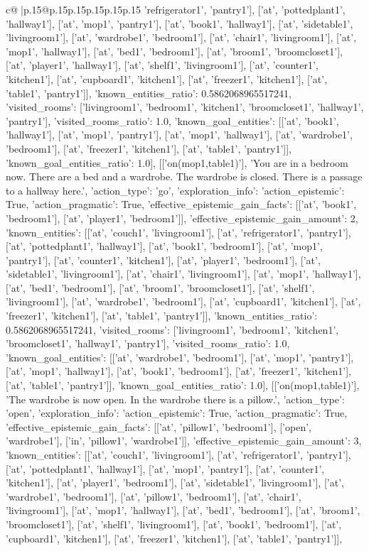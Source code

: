 \documentclass{article}
\begin{document}
{\begin{supertabular}{c@{$\;$}|p{.15\linewidth}@{}p{.15\linewidth}p{.15\linewidth}p{.15\linewidth}p{.15\linewidth}p{.15\linewidth}}
{{{'refrigerator1', 'pantry1'], ['at', 'pottedplant1', 'hallway1'], ['at', 'mop1', 'pantry1'], ['at', 'book1', 'hallway1'], ['at', 'sidetable1', 'livingroom1'], ['at', 'wardrobe1', 'bedroom1'], ['at', 'chair1', 'livingroom1'], ['at', 'mop1', 'hallway1'], ['at', 'bed1', 'bedroom1'], ['at', 'broom1', 'broomcloset1'], ['at', 'player1', 'hallway1'], ['at', 'shelf1', 'livingroom1'], ['at', 'counter1', 'kitchen1'], ['at', 'cupboard1', 'kitchen1'], ['at', 'freezer1', 'kitchen1'], ['at', 'table1', 'pantry1']], 'known_entities_ratio': 0.5862068965517241, 'visited_rooms': ['livingroom1', 'bedroom1', 'kitchen1', 'broomcloset1', 'hallway1', 'pantry1'], 'visited_rooms_ratio': 1.0, 'known_goal_entities': [['at', 'book1', 'hallway1'], ['at', 'mop1', 'pantry1'], ['at', 'mop1', 'hallway1'], ['at', 'wardrobe1', 'bedroom1'], ['at', 'freezer1', 'kitchen1'], ['at', 'table1', 'pantry1']], 'known_goal_entities_ratio': 1.0}}], [['on(mop1,table1)'], 'You are in a bedroom now. There are a bed and a wardrobe. The wardrobe is closed. There is a passage to a hallway here.', {'action_type': 'go', 'exploration_info': {'action_epistemic': True, 'action_pragmatic': True, 'effective_epistemic_gain_facts': [['at', 'book1', 'bedroom1'], ['at', 'player1', 'bedroom1']], 'effective_epistemic_gain_amount': 2, 'known_entities': [['at', 'couch1', 'livingroom1'], ['at', 'refrigerator1', 'pantry1'], ['at', 'pottedplant1', 'hallway1'], ['at', 'book1', 'bedroom1'], ['at', 'mop1', 'pantry1'], ['at', 'counter1', 'kitchen1'], ['at', 'player1', 'bedroom1'], ['at', 'sidetable1', 'livingroom1'], ['at', 'chair1', 'livingroom1'], ['at', 'mop1', 'hallway1'], ['at', 'bed1', 'bedroom1'], ['at', 'broom1', 'broomcloset1'], ['at', 'shelf1', 'livingroom1'], ['at', 'wardrobe1', 'bedroom1'], ['at', 'cupboard1', 'kitchen1'], ['at', 'freezer1', 'kitchen1'], ['at', 'table1', 'pantry1']], 'known_entities_ratio': 0.5862068965517241, 'visited_rooms': ['livingroom1', 'bedroom1', 'kitchen1', 'broomcloset1', 'hallway1', 'pantry1'], 'visited_rooms_ratio': 1.0, 'known_goal_entities': [['at', 'wardrobe1', 'bedroom1'], ['at', 'mop1', 'pantry1'], ['at', 'mop1', 'hallway1'], ['at', 'book1', 'bedroom1'], ['at', 'freezer1', 'kitchen1'], ['at', 'table1', 'pantry1']], 'known_goal_entities_ratio': 1.0}}], [['on(mop1,table1)'], 'The wardrobe is now open. In the wardrobe there is a pillow.', {'action_type': 'open', 'exploration_info': {'action_epistemic': True, 'action_pragmatic': True, 'effective_epistemic_gain_facts': [['at', 'pillow1', 'bedroom1'], ['open', 'wardrobe1'], ['in', 'pillow1', 'wardrobe1']], 'effective_epistemic_gain_amount': 3, 'known_entities': [['at', 'couch1', 'livingroom1'], ['at', 'refrigerator1', 'pantry1'], ['at', 'pottedplant1', 'hallway1'], ['at', 'mop1', 'pantry1'], ['at', 'counter1', 'kitchen1'], ['at', 'player1', 'bedroom1'], ['at', 'sidetable1', 'livingroom1'], ['at', 'wardrobe1', 'bedroom1'], ['at', 'pillow1', 'bedroom1'], ['at', 'chair1', 'livingroom1'], ['at', 'mop1', 'hallway1'], ['at', 'bed1', 'bedroom1'], ['at', 'broom1', 'broomcloset1'], ['at', 'shelf1', 'livingroom1'], ['at', 'book1', 'bedroom1'], ['at', 'cupboard1', 'kitchen1'], ['at', 'freezer1', 'kitchen1'], ['at', 'table1', 'pantry1']], }}}
\end{supertabular}}
\end{document}
